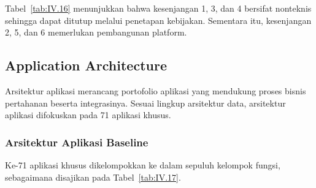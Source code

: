 Tabel~\ref{tab:IV.16} menunjukkan bahwa kesenjangan 1, 3, dan 4 bersifat nonteknis sehingga dapat ditutup melalui penetapan kebijakan. Sementara itu, kesenjangan 2, 5, dan 6 memerlukan pembangunan platform.

\subsection{Application Architecture}
\label{sec:IV.4.2}

Arsitektur aplikasi merancang portofolio aplikasi yang mendukung proses bisnis pertahanan beserta integrasinya. Sesuai lingkup arsitektur data, arsitektur aplikasi difokuskan pada 71 aplikasi khusus.

\subsubsection{Arsitektur Aplikasi Baseline}
\label{sec:IV.4.2.1}

Ke-71 aplikasi khusus dikelompokkan ke dalam sepuluh kelompok fungsi, sebagaimana disajikan pada Tabel~\ref{tab:IV.17}.

